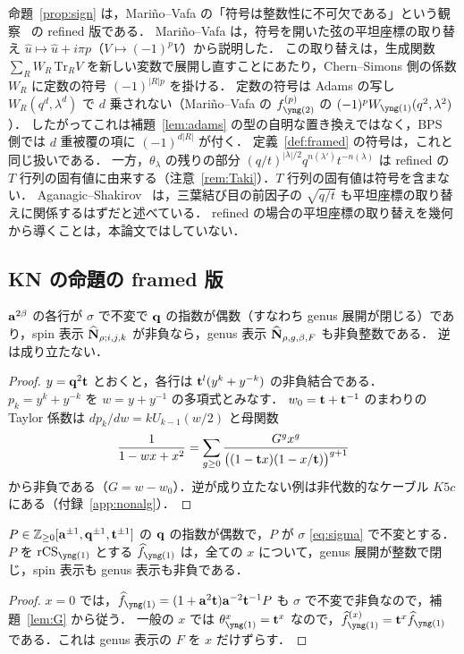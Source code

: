 命題~\ref{prop:sign} は，Mariño--Vafa の「符号は整数性に不可欠である」という観察~\cite{Marino01} の refined 版である．
Mariño--Vafa は，符号を開いた弦の平坦座標の取り替え $\hat u\mapsto\hat u+i\pi p$（$V\mapsto(-1)^pV$）から説明した．
この取り替えは，生成関数 $\sum_RW_R\,\mathrm{Tr}_RV$ を新しい変数で展開し直すことにあたり，Chern--Simons 側の係数 $W_R$ に定数の符号 $(-1)^{|R|p}$ を掛ける．
定数の符号は Adams の写し $W_R(q^d,\lambda^d)$ で $d$ 乗されない（Mariño--Vafa の $f^{(p)}_{\yng(2)}$ の $(-1)^pW_{\yng(1)}(q^2,\lambda^2)$）．
したがってこれは補題~\ref{lem:adams} の型の自明な置き換えではなく，BPS 側では $d$ 重被覆の項に $(-1)^{d|R|}$ が付く．
定義~\ref{def:framed} の符号は，これと同じ扱いである．
一方，$\theta_\lambda$ の残りの部分 $(q/t)^{|\lambda|/2}q^{n(\lambda')}t^{-n(\lambda)}$ は refined の $T$ 行列の固有値に由来する（注意~\ref{rem:Taki}）．$T$ 行列の固有値は符号を含まない．
Aganagic--Shakirov~\cite{Aganagic11} は，三葉結び目の前因子の $\sqrt{q/t}$ も平坦座標の取り替えに関係するはずだと述べている．
refined の場合の平坦座標の取り替えを幾何から導くことは，本論文ではしていない．

\subsection{KN の命題の framed 版}
\begin{lemma}\label{lem:G}
$\mathbf{a}^{2\beta}$ の各行が $\sigma$ で不変で $\mathbf{q}$ の指数が偶数（すなわち genus 展開が閉じる）であり，spin 表示 $\widehat{\mathbf{N}}_{\rho;i,j,k}$ が非負なら，genus 表示 $\widehat{\mathbf{N}}_{\rho,g,\beta,F}$ も非負整数である．
逆は成り立たない．
\end{lemma}
\begin{proof}
$y=\mathbf{q}^2\mathbf{t}$ とおくと，各行は $\mathbf{t}^l(y^k+y^{-k})$ の非負結合である．
$p_k=y^k+y^{-k}$ を $w=y+y^{-1}$ の多項式とみなす．
$w_0=\mathbf{t}+\mathbf{t}^{-1}$ のまわりの Taylor 係数は $dp_k/dw=kU_{k-1}(w/2)$ と母関数
\[
\frac{1}{1-wx+x^2}=\sum_{g\ge0}\frac{G^g x^g}{\bigl((1-\mathbf{t} x)(1-x/\mathbf{t})\bigr)^{g+1}}
\]
から非負である（$G=w-w_0$）．逆が成り立たない例は非代数的なケーブル $K5c$ にある（付録~\ref{app:nonalg}）．
\end{proof}

\begin{proposition}\label{prop:one}
$P\in\mathbb{Z}_{\ge0}[\mathbf{a}^{\pm1},\mathbf{q}^{\pm1},\mathbf{t}^{\pm1}]$ の $\mathbf{q}$ の指数が偶数で，$P$ が $\sigma$ \eqref{eq:sigma} で不変とする．
$P$ を $\rCS_{\yng(1)}$ とする $\hf_{\yng(1)}$ は，全ての $x$ について，genus 展開が整数で閉じ，spin 表示も genus 表示も非負である．
\end{proposition}
\begin{proof}
$x=0$ では，$\hf_{\yng(1)}=(1+\ba^2\bt)\ba^{-2}\bt^{-1}P$ も $\sigma$ で不変で非負なので，補題~\ref{lem:G} から従う．
一般の $x$ では $\theta_{\yng(1)}^x=\bt^x$ なので，$\hf^{(x)}_{\yng(1)}=\bt^x\hf_{\yng(1)}$ である．これは genus 表示の $F$ を $x$ だけずらす．
\end{proof}

